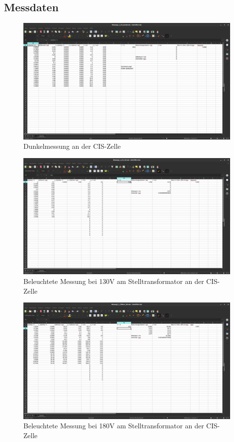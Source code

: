 \subsection{Messdaten}
\begin{figure}[h]
    \captionsetup{justification=centering,margin=2cm}
    \centering
    \includegraphics[angle = 90, width = 12cm]{Bilder/Daten/MessunngCISDunkel.png}
    \caption{Dunkelmessung an der CIS-Zelle}
\end{figure}

\begin{figure}[h]
    \captionsetup{justification=centering,margin=2cm}
    \centering
    \includegraphics[angle = 90, width = 12cm]{Bilder/Daten/MessunngCIS130.png}
    \caption{Beleuchtete Messung bei 130V am Stelltransformator an der CIS-Zelle}
\end{figure}


\begin{figure}[h]
    \captionsetup{justification=centering,margin=2cm}
    \centering
    \includegraphics[angle = 90, width = 12cm]{Bilder/Daten/MessunngMonoSi180.png}
    \caption{Beleuchtete Messung bei 180V am Stelltransformator an der CIS-Zelle}
\end{figure}



